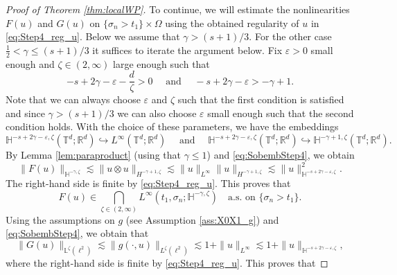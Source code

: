 \documentclass[11pt, a4paper,oneside, reqno]{amsart}
\theoremstyle{remark} %
\theoremstyle{definition} %
\numberwithin{theorem}{section}
\numberwithin{equation}{section}
\newcommand{\Om}{\Omega}
\newcommand{\T}{\mathbb{T}}
\newcommand{\Ls}{\mathbb{L}}
\newcommand{\Hs}{\mathbb{H}}
\newcommand{\RR}{\mathbb{R}}
\newcommand{\half}{\frac{1}{2}}
\newcommand{\RRd}{\RR^d}
\newcommand{\eps}{\varepsilon}
\newcommand{\gam}{\gamma}
\begin{document}
\begin{proof}[Proof of Theorem \ref{thm:localWP}]
To continue, we will estimate the nonlinearities $F(u)$ and $G(u)$ on $\{\sigma_n>t_1\}\times \Om$ using the obtained regularity of $u$ in \eqref{eq:Step4_reg_u}. Below we assume that $\gam>  (s+1)/3$. For the other case $\half <\gam \leq (s+1)/3$ it suffices to iterate the argument below. Fix $\eps>0$ small enough and $\zeta\in (2,\infty)$ large enough such that 
\begin{equation*}
    -s+2\gam-\eps-\frac{d}{\zeta}>0\quad \text{ and }\quad -s+2\gamma-\eps> -\gam+1.
\end{equation*}
Note that we can always choose $\eps$ and $\zeta$ such that the first condition is satisfied and since $\gam> (s+1)/3$ we can also choose $\eps$ small enough such that the second condition holds. With the choice of these parameters, we have the embeddings
\begin{equation}\label{eq:SobembStep4}
    \Hs^{-s+2\gam-\eps, \zeta}(\T^d;\RRd)\hookrightarrow L^{\infty}(\T^d;\RRd)\quad \text{ and }\quad \Hs^{-s+2\gam-\eps,\zeta}(\T^d;\RRd)\hookrightarrow \Hs^{-\gam+1,\zeta}(\T^d;\RRd).
\end{equation}
By Lemma \ref{lem:paraproduct} (using that $\gam\leq 1$) and \eqref{eq:SobembStep4}, we obtain
\begin{equation*}
    \|F(u)\|_{\Hs^{-\gam,\zeta}}\lesssim \|u\otimes u\|_{H^{-\gam+1,\zeta}}\lesssim \|u\|_{L^\infty}\|u\|_{H^{-\gam+1,\zeta}} \lesssim \|u\|^2_{\Hs^{-s+2\gam-\eps,\zeta}}.
\end{equation*}
The right-hand side is finite by \eqref{eq:Step4_reg_u}. This proves that
\begin{equation*}
    F(u)\in \bigcap_{\zeta\in (2,\infty)} L^\infty(t_1, \sigma_n; \Hs^{-\gam,\zeta})\quad \text{a.s. on }\{\sigma_n >t_1\}.
\end{equation*}
Using the assumptions on $g$ (see Assumption \ref{ass:X0X1_g}) and \eqref{eq:SobembStep4}, we obtain that 
\begin{equation*}
    \|G(u)\|_{\Ls^\zeta(\ell^2)}\lesssim \|g(\cdot, u)\|_{L^\zeta(\ell^2)}\lesssim  1+\|u\|_{L^\infty}
\lesssim 1+ \|u\|_{\Hs^{-s+2\gam-\eps,\zeta}} ,
\end{equation*}
where the right-hand side is finite by \eqref{eq:Step4_reg_u}. This proves that

\end{proof}
\end{document}
